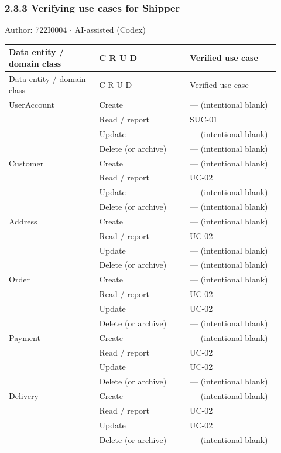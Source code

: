 \subsubsection*{2.3.3 Verifying use cases for Shipper}
Author: 722I0004 \ensuremath{\cdot} AI-assisted (Codex)

\begin{longtable}{>{\raggedright\arraybackslash}p{0.3067\linewidth}>{\raggedright\arraybackslash}p{0.3067\linewidth}>{\raggedright\arraybackslash}p{0.3067\linewidth}}
Data entity / domain class & C R U D & Verified use case \\
\hline\endfirsthead
Data entity / domain class & C R U D & Verified use case \\
\hline\endhead
UserAccount & Create & --- (intentional blank) \\
 & Read / report & SUC-01 \\
 & Update & --- (intentional blank) \\
 & Delete (or archive) & --- (intentional blank) \\
Customer & Create & --- (intentional blank) \\
 & Read / report & UC-02 \\
 & Update & --- (intentional blank) \\
 & Delete (or archive) & --- (intentional blank) \\
Address & Create & --- (intentional blank) \\
 & Read / report & UC-02 \\
 & Update & --- (intentional blank) \\
 & Delete (or archive) & --- (intentional blank) \\
Order & Create & --- (intentional blank) \\
 & Read / report & UC-02 \\
 & Update & UC-02 \\
 & Delete (or archive) & --- (intentional blank) \\
Payment & Create & --- (intentional blank) \\
 & Read / report & UC-02 \\
 & Update & UC-02 \\
 & Delete (or archive) & --- (intentional blank) \\
Delivery & Create & --- (intentional blank) \\
 & Read / report & UC-02 \\
 & Update & UC-02 \\
 & Delete (or archive) & --- (intentional blank) \\
\end{longtable}
